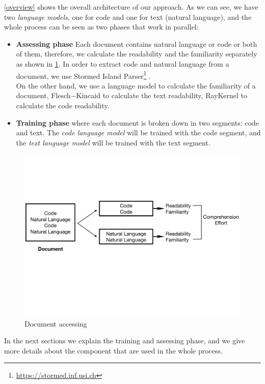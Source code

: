 \documentclass[12pt,mscthesis]{usiinfthesis}
\begin{document}
	\cref{overview} shows the overall architecture of our approach. As we can see, we have two \emph{language models}, one for code and one for text (natural language), and the whole process can be seen as two phases that work in parallel: 
	\begin{itemize}
		\item \textbf{Assessing phase}  Each document contains natural language or code or both of them, therefore, we calculate the readability and the familiarity separately as shown in \cref{fig1}. 
		In order to extract code and natural language from a document, we use Stormed Island Parser\footnote{\url{https://stormed.inf.usi.ch}} \cite{Ponz2015a}.\\
		On the other hand, we use a language model to calculate the familiarity of a document, Flesch$-$Kincaid to calculate the text readability, RayKernel \cite{Buse:2010:LMC:1850489.1850615} to calculate the code readability.
		\item \textbf{Training phase} where each document is broken down in two segments: code and text. The \emph{code language model} will be trained with the code segment, and the \emph{text language model} will be trained with the text segment.
	\end{itemize}

	\begin{figure}[htbp]
	\centering
	\includegraphics[width=\textwidth]{fig1}
	\caption{Document accessing}
	\label{fig1}
	\end{figure}

	In the next sections we explain the training and assessing phase, and we give more details about the component that are used in the whole process.
\end{document}
